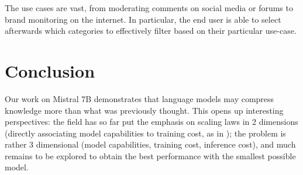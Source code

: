  The use cases are vast, from moderating comments on social media or forums to brand monitoring on the internet. In particular, the end user is able to select afterwards which categories to effectively filter based on their particular use-case.

\section{Conclusion}

Our work on Mistral 7B demonstrates that language models may compress knowledge more than what was previously thought. This opens up interesting perspectives: the field has so far put the emphasis on scaling laws in 2 dimensions (directly associating model capabilities to training cost, as in \cite{hoffmann2022compute}); the problem is rather 3 dimensional (model capabilities, training cost, inference cost), and much remains to be explored to obtain the best performance with the smallest possible model.


